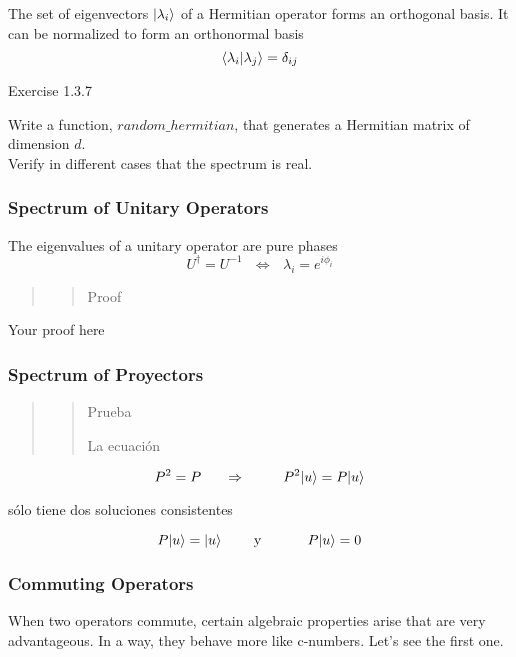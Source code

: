 \documentclass[11pt]{article}
\begin{document}
    The set of eigenvectors \(|\lambda_i\rangle\) of a Hermitian operator
forms an orthogonal basis. It can be normalized to form an orthonormal
basis \[
\langle \lambda_i|\lambda_j\rangle = \delta_{ij}
\]

    Exercise 1.3.7

Write a function, \(random\_hermitian\), that generates a Hermitian
matrix of dimension \(d\). \\
Verify in different cases that the spectrum is real.

    \subsubsection{Spectrum of Unitary
Operators}\label{spectrum-of-unitary-operators}

The eigenvalues of a unitary operator are pure phases \[
U^\dagger = U^{-1} ~~~\Longleftrightarrow ~~~\lambda_i = e^{i\phi_i}
\]

\begin{quote}
\begin{quote}
Proof
\end{quote}
\end{quote}

Your proof here

    \subsubsection{Spectrum of Proyectors}\label{spectrum-of-proyectors}

\begin{quote}
\begin{quote}
Prueba

La ecuación
\end{quote}
\end{quote}

\[ P^2 = P ~~~~~\Rightarrow ~~~~~~~~ P^2 |u\rangle = P|u\rangle \]

sólo tiene dos soluciones consistentes

\[
P|u\rangle = |u\rangle~~~~~~~\hbox{y} ~~~~~~~~~~P|u\rangle = 0
\]

    \subsubsection{Commuting Operators}\label{commuting-operators}

When two operators commute, certain algebraic properties arise that are
very advantageous. In a way, they behave more like c-numbers. Let's see
the first one.
\end{document}
